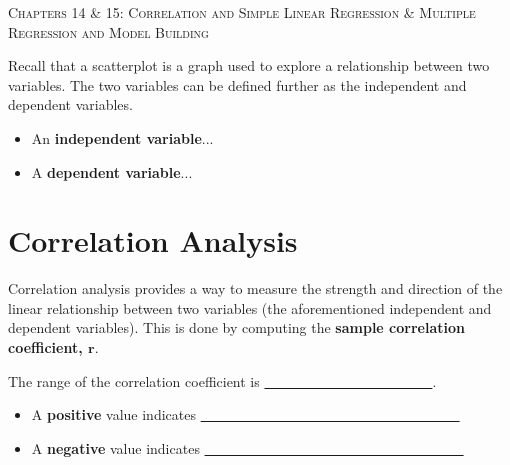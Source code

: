 \documentclass[12pt, letterpaper]{article}
\theoremstyle{definition}
\begin{document}


\begin{center}

{\LARGE \textsc{Chapters 14 \& 15:  Correlation and Simple Linear Regression \& Multiple Regression and Model Building}}
\end{center}


\noindent Recall that a scatterplot is a graph used to explore a relationship between two variables.  The two variables can be defined further as the independent and dependent variables.

\begin{itemize}

\item An \textbf{independent variable}...
\vspace*{.3in}

\item A \textbf{dependent variable}...
\vspace*{.3in}

\end{itemize}


\section*{Correlation Analysis}

\noindent Correlation analysis provides a way to measure the strength and direction of the linear relationship between two variables (the aforementioned independent and dependent variables).  This is done by computing the \textbf{sample correlation coefficient, $\mathbf{r}$}.

\vspace*{.1in}

\noindent The range of the correlation coefficient is \underline{~~~~~~~~~~~~~~~~~~~~~~~~}.

\begin{itemize}
\item A \textbf{positive} value indicates \underline{~~~~~~~~~~~~~~~~~~~~~~~~~~~~~~~~~~~~~}

\vspace*{.1in}

\item A \textbf{negative} value indicates \underline{~~~~~~~~~~~~~~~~~~~~~~~~~~~~~~~~~~~~~}
\end{itemize}

\vspace*{.1in}
\end{document}
